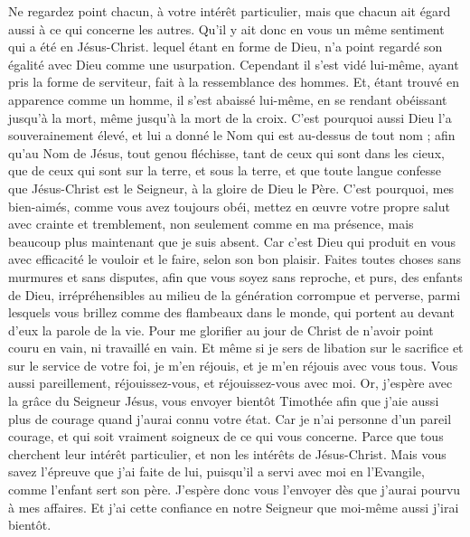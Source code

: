 \begin{multicols}{2}
Ne regardez point chacun, à votre intérêt particulier, mais que chacun ait égard aussi à ce qui concerne les autres.
Qu'il y ait donc en vous un même sentiment qui a été en Jésus-Christ. 
lequel étant en forme de Dieu, n'a point regardé son égalité avec Dieu comme une usurpation.
Cependant il s'est vidé lui-même, ayant pris la forme de serviteur, fait à la ressemblance des hommes.
Et, étant trouvé en apparence comme un homme, il s'est abaissé lui-même, en se rendant obéissant jusqu'à la mort, même jusqu'à la mort de la croix. 
C'est pourquoi aussi Dieu l'a souverainement élevé, et lui a donné le Nom qui est au-dessus de tout nom ;
afin qu'au Nom de Jésus, tout genou fléchisse, tant de ceux qui sont dans les cieux, que de ceux qui sont sur la terre, et sous la terre,
et que toute langue confesse que Jésus-Christ est le Seigneur, à la gloire de Dieu le Père.
C'est pourquoi, mes bien-aimés, comme vous avez toujours obéi, mettez en œuvre votre propre salut avec crainte et tremblement, non seulement comme en ma présence, mais beaucoup plus maintenant que je suis absent.
Car c'est Dieu qui produit en vous avec efficacité le vouloir et le faire, selon son bon plaisir.
Faites toutes choses sans murmures et sans disputes,
afin que vous soyez sans reproche, et purs, des enfants de Dieu, irrépréhensibles au milieu de la génération corrompue et perverse, parmi lesquels vous brillez comme des flambeaux dans le monde, qui portent au devant d'eux la parole de la vie. 
Pour me glorifier au jour de Christ de n'avoir point couru en vain, ni travaillé en vain. 
Et même si je sers de libation sur le sacrifice et sur le service de votre foi, je m'en réjouis, et je m'en réjouis avec vous tous.
Vous aussi pareillement, réjouissez-vous, et réjouissez-vous avec moi.
Or, j'espère avec la grâce du Seigneur Jésus, vous envoyer bientôt Timothée afin que j'aie aussi plus de courage quand j'aurai connu votre état. 
Car je n'ai personne d'un pareil courage, et qui soit vraiment soigneux de ce qui vous concerne. 
Parce que tous cherchent leur intérêt particulier, et non les intérêts de Jésus-Christ. 
Mais vous savez l'épreuve que j'ai faite de lui, puisqu'il a servi avec moi en l'Evangile, comme l'enfant sert son père.
J'espère donc vous l'envoyer dès que j'aurai pourvu à mes affaires.
Et j'ai cette confiance en notre Seigneur que moi-même aussi j'irai bientôt.

\end{multicols}
